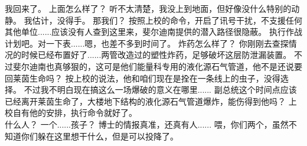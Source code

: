 \documentclass[openany]{book}
\begin{document}
\begin{dialogue}
     我回来了。
     上面怎么样了？
     听不太清楚，我没上到地面，但好像没什么特别的动静。
     我估计，没得手。
     那我们？
     按照上校的命令，开启了讯号干扰，不支援任何其他单位......应该没有人查到这里来，斐尔迪南提供的潜入路径很隐蔽。
     执行作战计划吧。对一下表......嗯，也差不多到时间了。
     炸药怎么样了？
     你刚刚去查探情况的时候已经布置好了......两管改造过的塑性炸药，足够破坏这层防泄漏装置。
     不过斐尔迪南也真够狠的，这可是他们能量科专用的液化源石气管道，他不是还说要回莱茵生命吗？
     按上校的说法，他和咱们现在是拴在一条线上的虫子，没得选择。
     不过我不明白现在搞这么一场爆破的意义在哪里......
     副总统这个时间点应该已经离开莱茵生命了，大楼地下结构的液化源石气管道爆炸，能伤得到他吗？
     上校自有他的安排，执行命令就好了。
    \\
     什么人？
     一个......孩子？
     博士的情报真准，还真有人......
     喂，你们两个，虽然不知道你们躲在这里想干什么，但是可以投降了。
\end{dialogue}
\end{document}
